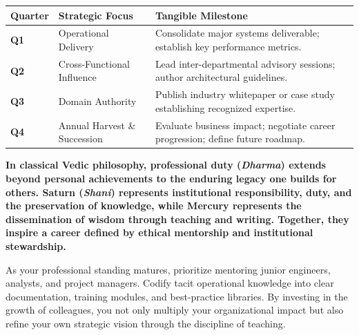 
\begin{highlightcard}
  \sffamily\fontsize{8}{11.5}\selectfont
  \begin{tabularx}{\linewidth}{@{}l l X@{}}
    \toprule
    \textbf{Quarter} & \textbf{Strategic Focus} & \textbf{Tangible Milestone} \\
    \midrule
    \textbf{Q1} & Operational Delivery & Consolidate major systems deliverable; establish key performance metrics. \\
    \textbf{Q2} & Cross-Functional Influence & Lead inter-departmental advisory sessions; author architectural guidelines. \\
    \textbf{Q3} & Domain Authority & Publish industry whitepaper or case study establishing recognized expertise. \\
    \textbf{Q4} & Annual Harvest \& Succession & Evaluate business impact; negotiate career progression; define future roadmap. \\
    \bottomrule
  \end{tabularx}
\end{highlightcard}\vspace{2mm}

\label{topic71}

{\fontsize{9.5}{13.8}\selectfont\bfseries\color{DeepSlate} In classical Vedic philosophy, professional duty (\textit{Dharma}) extends beyond personal achievements to the enduring legacy one builds for others. Saturn (\textit{Shani}) represents institutional responsibility, duty, and the preservation of knowledge, while Mercury represents the dissemination of wisdom through teaching and writing. Together, they inspire a career defined by ethical mentorship and institutional stewardship.}\par\vspace{2mm}

{\fontsize{9}{13}\selectfont As your professional standing matures, prioritize mentoring junior engineers, analysts, and project managers. Codify tacit operational knowledge into clear documentation, training modules, and best-practice libraries. By investing in the growth of colleagues, you not only multiply your organizational impact but also refine your own strategic vision through the discipline of teaching.}\par\vspace{1.8mm}

